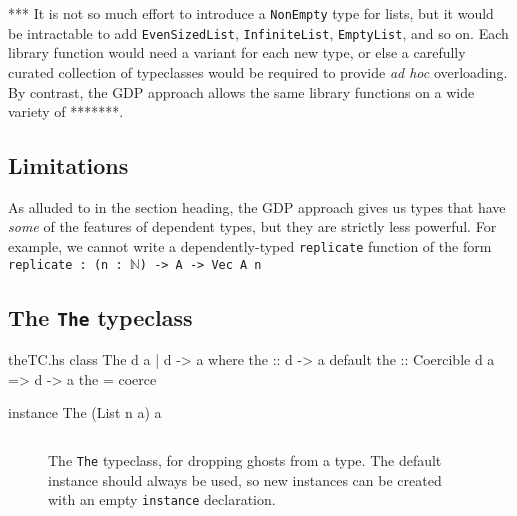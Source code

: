 \documentclass[format=sigplan, review=false, screen=true]{acmart}
\begin{document}
*** It is not so much effort to introduce a \texttt{NonEmpty} type for lists, but it
would be intractable to add \texttt{EvenSizedList}, \texttt{InfiniteList},
\texttt{EmptyList}, and so on. Each library function would need a variant
for each new type, or else a carefully curated collection of typeclasses would
be required to provide \emph{ad hoc} overloading. By contrast, the GDP approach
allows the same library functions on a wide variety of *******.





   
\subsection{Limitations}
As alluded to in the section heading, the GDP approach gives us
types that have \emph{some} of the features of dependent types, but
they are strictly less powerful. For example, we cannot
write a dependently-typed \texttt{replicate} function of the form
\texttt{replicate : (n : $\mathbb{N}$) -> A -> Vec A n}

\subsection{The \texttt{The} typeclass}
\begin{filecontents*}{theTC.hs}
class The d a | d -> a where
    the :: d -> a
    default the :: Coercible d a => d -> a
    the = coerce
    
instance The (List n a) a
\end{filecontents*}

\begin{figure}
  \inputminted{haskell}{theTC.hs}
  \caption{The \texttt{The} typeclass, for dropping ghosts
    from a type. The default instance should always be used,
    so new instances can be created with an empty
    \texttt{instance} declaration.}
\end{figure}




  
\end{document}
